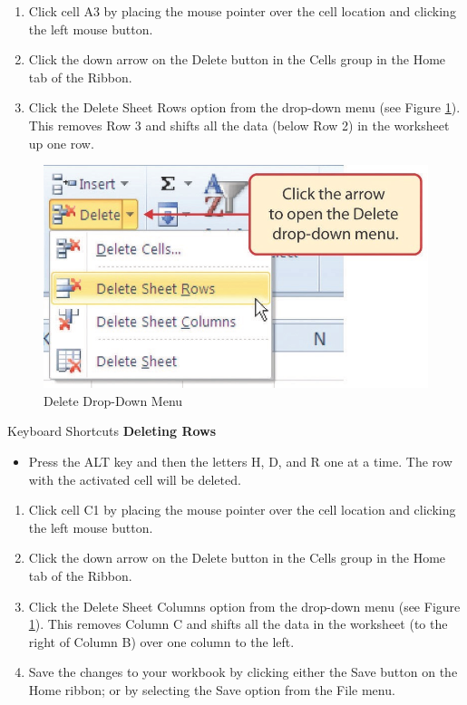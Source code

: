 \begin{enumerate}
	\item Click cell \textsf{A3} by placing the mouse pointer over the cell location and clicking the left mouse button.
	\item Click the down arrow on the Delete button in the Cells group in the Home tab of the Ribbon.
	\item Click the Delete Sheet Rows option from the drop-down menu (see Figure \ref{01:fig31}). This removes Row 3 and shifts all the data (below Row 2) in the worksheet up one row.
\end{enumerate}

\begin{figure}[H]
	\centering
	\includegraphics[width=\maxwidth{.95\linewidth}]{gfx/ch01_fig31}
	\caption{Delete Drop-Down Menu}
	\label{01:fig31}
\end{figure}

\begin{center}
	\begin{shtcutbox}{Keyboard Shortcuts}
		\textbf{Deleting Rows}
		\\
		\begin{itemize}
			\setlength{\itemsep}{0pt}
			\setlength{\parskip}{0pt}
			\setlength{\parsep}{0pt}
			
			\item Press the ALT key and then the letters H, D, and R one at a time. The row with the activated cell will be deleted.
			
		\end{itemize}
	\end{shtcutbox}
\end{center}

\begin{enumerate}[resume]
	\item Click cell C1 by placing the mouse pointer over the cell location and clicking the left mouse button.
	\item Click the down arrow on the Delete button in the Cells group in the Home tab of the Ribbon.
	\item Click the Delete Sheet Columns option from the drop-down menu (see Figure \ref{01:fig31}). This removes Column C and shifts all the data in the worksheet (to the right of Column B) over one column to the left.
	\item Save the changes to your workbook by clicking either the Save button on the Home ribbon; or by selecting the Save option from the File menu.
\end{enumerate}

